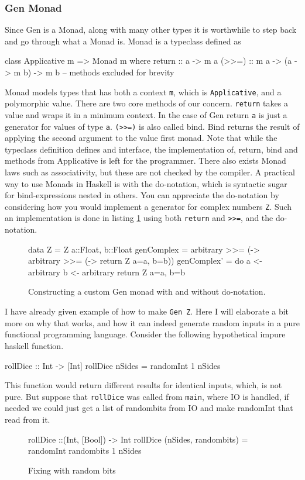\subsubsection{Gen Monad}
Since Gen is a Monad, along with many other types it is worthwhile to step back and go through what a Monad is. Monad is a typeclass defined as
\begin{hscode}
    class Applicative m => Monad m where
        return :: a -> m a
        (>>=) :: m a -> (a -> m b) -> m b 
        -- methods excluded for brevity
\end{hscode}
Monad models types that has both a context \verb|m|, which is \verb|Applicative|, and a polymorphic value. There are two core methods of our concern. 
\verb|return| takes a value and wraps it in a minimum context. In the case of Gen return \verb|a| is just a generator for values of type \verb|a|.
\verb|(>>=)| is also called bind. Bind returns the result of applying the second argument to the value first monad. Note that while the typeclass definition defines and interface, the implementation of, return, bind and methods from Applicative is left for the programmer. There also exists Monad laws such as associativity, but these are not checked by the compiler. 
A practical way to use Monads in Haskell is with the do-notation, which is syntactic sugar for bind-expressions nested in others. You can appreciate the do-notation by considering how you would implement a generator for complex numbers \verb|Z|. Such an implementation is done in listing \ref{lst:genComplex} using both \verb|return| and \verb|>>=|, and the do-notation.
\begin{figure}
    \begin{hscode}
    data Z = Z {a::Float, b::Float}
    genComplex = arbitrary >>= (\a -> arbitrary >>= (\b -> return Z {a=a, b=b}))
    genComplex' = do 
        a <- arbitrary
        b <- arbitrary
        return Z {a=a, b=b}
    \end{hscode} 
    \caption{Constructing a custom Gen monad with and without do-notation.}
    \label{lst:genComplex}
\end{figure}

I have already given example of how to make \verb|Gen Z|. Here I will elaborate a bit more on why that works, and how it can indeed generate random inputs in a pure functional programming language.
Consider the following hypothetical impure haskell function.
\begin{hscode}
    rollDice :: Int -> [Int]
    rollDice nSides = 
         randomInt 1 nSides
\end{hscode}
This function would return different results for identical inputs, which, is not pure. But suppose that \verb|rollDice| was called from \verb|main|, where IO is handled, if needed we could just get a list of randombits from IO and make randomInt that read from it.
\begin{figure}
    \centering
    \begin{hscode}
    rollDice ::(Int, [Bool]) -> Int
    rollDice (nSides, randombits) = 
         randomInt randombits 1 nSides
    \end{hscode}
    \caption{Fixing with random bits}
    \label{lst:randombitsFix}
\end{figure}

